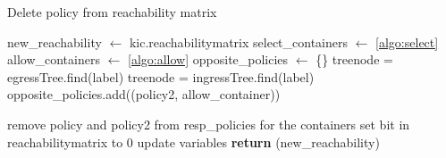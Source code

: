 \begin{algorithm}
    \caption{Delete policy from reachability matrix}
    \label{algo:deletepolicy}
    \begin{algorithmic}[1]
            \State new\_reachability $\gets$ kic.reachabilitymatrix
            \State select\_containers $\gets$ \autoref{algo:select}
            \State allow\_containers $\gets$ \autoref{algo:allow} 
            \State opposite\_policies $\gets$ \{\}
                        \State treenode = egressTree.find(label)
                    \Else
                        \State treenode = ingressTree.find(label)
                    \EndIf
                            \State  opposite\_policies.add((policy2, allow\_container))
                        \EndIf
                    \EndFor
                \EndFor
            \EndFor
            
                            \State remove policy and policy2 from resp\_policies for the containers
                                \State set bit in reachabilitymatrix to 0
                            \EndIf
                        \EndIf
                    \EndFor
                \EndFor
            \EndFor
            \State update variables
            \State \textbf{return} (new\_reachability)
        \EndFunction
  \end{algorithmic}
\end{algorithm}
